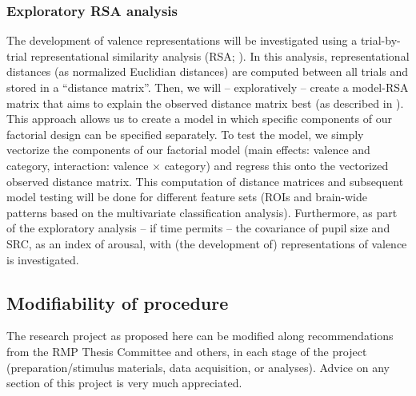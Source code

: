 \documentclass[12pt,a4paper]{article}\usepackage[]{graphicx}\usepackage[]{color}
\begin{document}
\subsubsection{Exploratory RSA analysis}
The development of valence representations will be investigated using a trial-by-trial representational similarity analysis (RSA; \citealp{kriegeskorte2008}). In this analysis, representational distances (as normalized Euclidian distances) are computed between all trials and stored in a ``distance matrix''. Then, we will -- exploratively -- create a model-RSA matrix that aims to explain the observed distance matrix best (as described in \citealp{walther2015}). This approach allows us to create a model in which specific components of our factorial design can be specified separately. To test the model, we simply vectorize the components of our factorial model (main effects: valence and category, interaction: valence $\times$ category) and regress this onto the vectorized observed distance matrix. This computation of distance matrices and subsequent model testing will be done for different feature sets (ROIs and brain-wide patterns based on the multivariate classification analysis). Furthermore, as part of the exploratory analysis -- if time permits -- the covariance of pupil size and SRC, as an index of arousal, with (the development of) representations of valence is investigated.

\subsection{Modifiability of procedure}
The research project as proposed here can be modified along recommendations from the RMP Thesis Committee and others, in each stage of the project (preparation/stimulus materials, data acquisition, or analyses). Advice on any section of this project is very much appreciated. \\

\noindent
\wordcount
\end{document}
